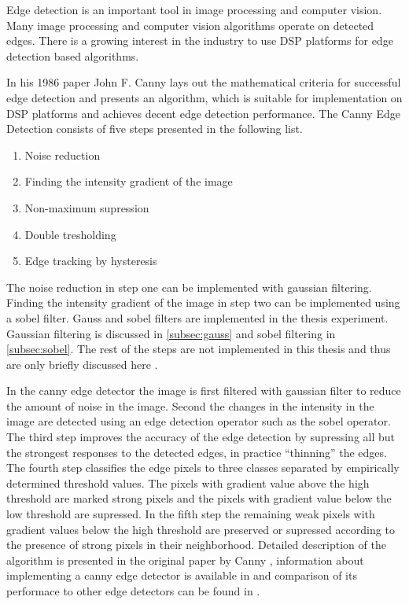 Edge detection is an important tool in image processing and computer vision. Many image processing and computer vision algorithms operate on detected edges. There is a growing interest in the industry to use DSP platforms for edge detection based algorithms.

In his 1986 paper John F. Canny \cite{canny1986computational} lays out the mathematical criteria for successful edge detection and presents an algorithm, which is suitable for implementation on DSP platforms and achieves decent edge detection performance. The Canny Edge Detection consists of five steps presented in the following list.

\begin{enumerate}
    \item{Noise reduction}
    \item{Finding the intensity gradient of the image}
    \item{Non-maximum supression}
    \item{Double tresholding}
    \item{Edge tracking by hysteresis}
\end{enumerate}

The noise reduction in step one can be implemented with gaussian filtering. Finding the intensity gradient of the image in step two can be implemented using a sobel filter. Gauss and sobel filters are implemented in the thesis experiment. Gaussian filtering is discussed in \ref{subsec:gauss} and sobel filtering in \ref{subsec:sobel}. The rest of the steps are not implemented in this thesis and thus are only briefly discussed here .

In the canny edge detector the image is first filtered with gaussian filter to reduce the amount of noise in the image. Second the changes in the intensity in the image are detected using an edge detection operator such as the sobel operator. The third step improves the accuracy of the edge detection by supressing all but the strongest responses to the detected edges, in practice ``thinning'' the edges. The fourth step classifies the edge pixels to three classes separated by empirically determined threshold values. The pixels with gradient value above the high threshold are marked strong pixels and the pixels with gradient value below the low threshold are supressed. In the fifth step the remaining weak pixels with gradient values below the high threshold are preserved or supressed according to the presence of strong pixels in their neighborhood. Detailed description of the algorithm is presented in the original paper by Canny \cite{canny1986computational}, information about implementing a canny edge detector is available in \cite{gonzalez2008digital} and comparison of its performace to other edge detectors can be found in \cite{maini2009study}.
